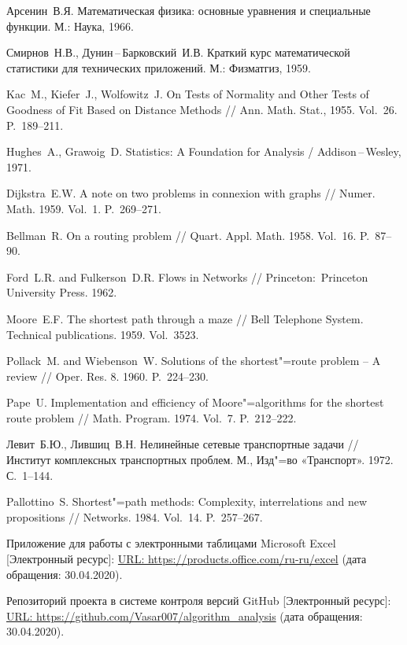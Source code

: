 \documentclass[a4paper, article, 14pt]{extarticle}
\begin{document}
\begin{thebibliography}{1}
	 Арсенин~В.\:Я. Математическая физика: основные уравнения и специальные функции. М.: Наука, 1966.

	 Смирнов~Н.\:В., Дунин\,--\,Барковский~И.\:В. Краткий курс математической статистики для технических приложений. М.: Физматгиз, 1959.

	 Kac~M., Kiefer~J., Wolfowitz~J. On Tests of Normality and Other Tests of Goodness of Fit Based on Distance Methods // Ann. Math. Stat., 1955. Vol.~26. P.~189--211.

	 Hughes~A., Grawoig~D. Statistics: A Foundation for Analysis / Addison\,--\,Wesley, 1971.

	 Dijkstra~E.\:W. A note on two problems in connexion with graphs // Numer. Math. 1959. Vol.~1. P.~269--271.

	 Bellman~R. On a routing problem // Quart. Appl. Math. 1958. Vol.~16. P.~87--90.

	 Ford~L.\:R. and Fulkerson~D.\:R. Flows in Networks // Princeton:~Princeton University Press. 1962.

	 Moore~E.\:F. The shortest path through a maze // Bell Telephone System. Technical publications. 1959. Vol.~3523.

	 Pollack~M. and Wiebenson~W. Solutions of the shortest"=route problem – A review // Oper. Res. 8. 1960. P.~224--230.

	 Pape~U. Implementation and efficiency of Moore"=algorithms for the shortest route problem // Math. Program. 1974. Vol.~7. P.~212--222.

	 Левит~Б.\:Ю., Лившиц~В.\:Н. Нелинейные сетевые транспортные задачи // Институт комплексных транспортных проблем. М., Изд"=во «Транспорт». 1972. С.~1--144.

	 Pallottino~S. Shortest"=path methods: Complexity, interrelations and new propositions // Networks. 1984. Vol.~14. P.~257--267.
	
	 Приложение для работы с электронными таблицами Microsoft Excel [Электронный ресурс]: \url{URL: https://products.office.com/ru-ru/excel} (дата обращения: 30.04.2020).

	 Репозиторий проекта в системе контроля версий GitHub [Электронный ресурс]: \url{URL: https://github.com/Vasar007/algorithm_analysis} (дата обращения: 30.04.2020).

\end{thebibliography}
\end{document}
